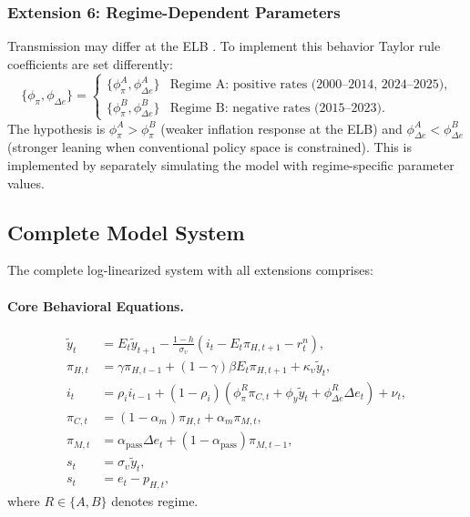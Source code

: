 \documentclass[12pt,a4paper]{article}
\begin{document}
\subsubsection{Extension 6: Regime-Dependent Parameters}

Transmission may differ at the ELB \citep{baurle2014, baumann2025}. To implement this behavior Taylor rule coefficients are set differently:
\begin{equation}
	\{\phi_\pi, \phi_{\Delta e}\} = 
	\begin{cases}
		\{\phi_\pi^A, \phi_{\Delta e}^A\} & \text{Regime A: positive rates (2000--2014, 2024--2025)}, \\
		\{\phi_\pi^B, \phi_{\Delta e}^B\} & \text{Regime B: negative rates (2015--2023)}.
	\end{cases}
	\label{eq:regime}
\end{equation}
The hypothesis is $\phi_\pi^A > \phi_\pi^B$ (weaker inflation response at the ELB) and $\phi_{\Delta e}^A < \phi_{\Delta e}^B$ (stronger leaning when conventional policy space is constrained). This is implemented by separately simulating the model with regime-specific parameter values.
\subsection{Complete Model System}
\label{subsec:complete_system}
The complete log-linearized system with all extensions comprises:

\paragraph{Core Behavioral Equations.}
\begin{align}
	\tilde{y}_t &= E_t\tilde{y}_{t+1} - \frac{1-h}{\sigma_\upsilon}(i_t - E_t\pi_{H,t+1} - r_t^n), 
	\label{eq:sys_IS} \tag{IS} \\
	\pi_{H,t} &= \gamma\pi_{H,t-1} + (1-\gamma)\beta E_t\pi_{H,t+1} + \kappa_\upsilon\tilde{y}_t, 
	\label{eq:sys_NKPC} \tag{NKPC} \\
	i_t &= \rho_i i_{t-1} + (1-\rho_i)(\phi_\pi^R\pi_{C,t} + \phi_y\tilde{y}_t + \phi_{\Delta e}^R\Delta e_t) + \nu_t, 
	\label{eq:sys_Taylor} \tag{Taylor} \\
	\pi_{C,t} &= (1-\alpha_m)\pi_{H,t} + \alpha_m\pi_{M,t}, 
	\label{eq:sys_CPI} \tag{CPI} \\
	\pi_{M,t} &= \alpha_{\text{pass}}\Delta e_t + (1-\alpha_{\text{pass}})\pi_{M,t-1}, 
	\label{eq:sys_import} \tag{Import} \\
	s_t &= \sigma_\upsilon\tilde{y}_t, 
	\label{eq:sys_tot} \tag{ToT} \\
	s_t &= e_t - p_{H,t}, 
	\label{eq:sys_er} \tag{ER def}
\end{align}
where $R \in \{A,B\}$ denotes regime.
\end{document}
